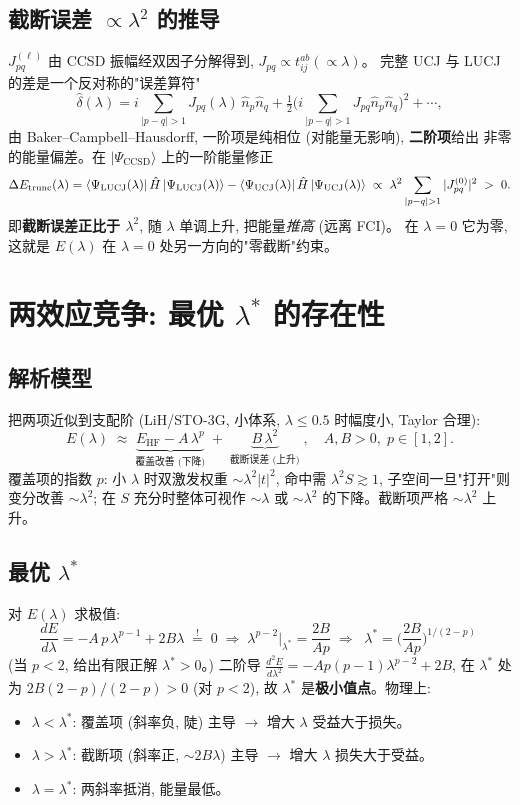 \documentclass[11pt]{article}
\begin{document}
\subsection*{截断误差 $\propto\lambda^2$ 的推导}
$J^{(\ell)}_{pq}$ 由 CCSD 振幅经双因子分解得到, $J_{pq}\propto t_{ij}^{ab}(\propto\lambda)$。
完整 UCJ 与 LUCJ 的差是一个反对称的"误差算符"
\[
  \hat\delta(\lambda)
  =i\sum_{|p-q|>1}J_{pq}(\lambda)\,\hat n_p\hat n_q+\tfrac{1}{2}\big(i\sum_{|p-q|>1}J_{pq}\hat n_p\hat n_q\big)^2+\cdots,
\]
由 Baker--Campbell--Hausdorff, 一阶项是纯相位 (对能量无影响), \textbf{二阶项}给出
非零的能量偏差。在 $|\Psi_{\text{CCSD}}\rangle$ 上的一阶能量修正
\[
  \Delta E_{\text{trunc}}(\lambda)
  =\bra{\Psi_{\text{LUCJ}}(\lambda)}\hat H\ket{\Psi_{\text{LUCJ}}(\lambda)}
   -\bra{\Psi_{\text{UCJ}}(\lambda)}\hat H\ket{\Psi_{\text{UCJ}}(\lambda)}
  \;\propto\;\lambda^2\sum_{|p-q|>1}|J^{(0)}_{pq}|^2\;>\;0 .
\]
即\textbf{截断误差正比于 $\lambda^2$}, 随 $\lambda$ 单调上升, 把能量\emph{推高} (远离 FCI)。
在 $\lambda=0$ 它为零, 这就是 $E(\lambda)$ 在 $\lambda=0$ 处另一方向的"零截断"约束。

\section{\texorpdfstring{两效应竞争: 最优 $\lambda^\ast$ 的存在性}{两效应竞争: 最优 lambda* 的存在性}}
\subsection*{解析模型}
把两项近似到支配阶 (LiH/STO-3G, 小体系, $\lambda\leq 0.5$ 时幅度小, Taylor 合理):
\[
  \boxed{\;
  E(\lambda)\;\approx\;
  \underbrace{E_{\text{HF}}-A\,\lambda^{p}}_{\text{覆盖改善 (下降)}}
  \;+\;
  \underbrace{B\,\lambda^{2}}_{\text{截断误差 (上升)}}
  \;,\quad A,B>0,\;p\in[1,2] .
  \;}
\]
覆盖项的指数 $p$: 小 $\lambda$ 时双激发权重 $\sim\lambda^2|t|^2$, 命中需 $\lambda^2 S\gtrsim 1$,
子空间一旦"打开"则变分改善 $\sim\lambda^2$; 在 $S$ 充分时整体可视作 $\sim\lambda$ 或
$\sim\lambda^2$ 的下降。截断项严格 $\sim\lambda^2$ 上升。

\subsection*{最优 $\lambda^\ast$}
对 $E(\lambda)$ 求极值:
\[
  \frac{dE}{d\lambda}=-A\,p\,\lambda^{p-1}+2B\lambda\;\stackrel{!}{=}\;0
  \;\Longrightarrow\;
  \lambda^{p-2}\Big|_{\lambda^\ast}=\frac{2B}{Ap}
  \;\Longrightarrow\;
  \boxed{\;\lambda^\ast=\Big(\frac{2B}{Ap}\Big)^{1/(2-p)}\;}
\]
(当 $p<2$, 给出有限正解 $\lambda^\ast>0$。) 二阶导
$\frac{d^2E}{d\lambda^2}=-Ap(p{-}1)\lambda^{p-2}+2B$, 在 $\lambda^\ast$ 处为
$2B(2-p)/(2-p) > 0$ (对 $p<2$), 故 $\lambda^\ast$ 是\textbf{极小值点}。物理上:
\begin{itemize}
  \item $\lambda<\lambda^\ast$: 覆盖项 (斜率负, 陡) 主导 $\to$ 增大 $\lambda$ 受益大于损失。
  \item $\lambda>\lambda^\ast$: 截断项 (斜率正, $\sim 2B\lambda$) 主导 $\to$ 增大 $\lambda$ 损失大于受益。
  \item $\lambda=\lambda^\ast$: 两斜率抵消, 能量最低。
\end{itemize}
\end{document}
